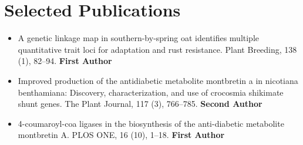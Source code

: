\documentclass[letterpaper,11pt]{article}
\makeatletter
\newcommand{\customfullcite}[2][]{%
    \begingroup
    \@ifundefined{custommaxnames}{%
        \def\custommaxnames{1}%
    }{}%
    \ifblank{#1}{}{%
        \def\custommaxnames{#1}%
    }%
    \def\abx@field@labelnumber{\custommaxnames}%
    \fullcite{#2}%
    \endgroup
}
\makeatother
\begin{document}

\section*{Selected Publications}
\begin{itemize}[leftmargin=0.15in, label={}]
    \item{A genetic linkage map in southern-by-spring oat identifies multiple quantitative trait loci for adaptation and rust
    resistance. Plant Breeding, 138 (1), 82–94.       \break \textbf{First Author}}
    \item{Improved production of the antidiabetic metabolite montbretin a in nicotiana
    benthamiana: Discovery, characterization, and use of crocosmia shikimate shunt genes. The Plant Journal,
    117 (3), 766–785.        \break \textbf{Second Author}}
    \item{4-coumaroyl-coa ligases in the biosynthesis of the anti-diabetic metabolite montbretin A. PLOS ONE, 16 (10),
    1–18.      \break \textbf{First Author}}
\end{itemize}
\end{document}
